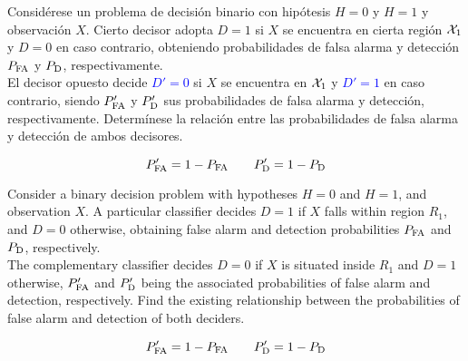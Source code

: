 \ifspanish

\question Considérese un problema de decisión binario con hipótesis $H=0$ y $H=1$ y observación $X$. Cierto decisor adopta $D=1$ si $X$ se encuentra en {cierta} región {${\cal X}_1$} y $D=0$ en caso contrario, obteniendo probabilidades de falsa alarma y detección $P_{\rm FA}$ y $P_{\rm D}$, respectivamente.\\
El decisor opuesto decide \textcolor{blue}{$D'=0$} si $X$ se encuentra en {${\cal X}_1$} y \textcolor{blue}{$D'=1$} en caso contrario, siendo $P_{\rm FA}'$ y $P_{\rm D}'$ sus probabilidades de falsa alarma y detección, respectivamente.  Determínese la relación entre las probabilidades de falsa alarma y detección de ambos decisores.\\
\begin{solution} 
$$P_{\rm FA}'=1-P_{\rm FA} \quad \quad P_{\rm D}'=1-P_{\rm D}$$
\end{solution}

\else

\question Consider a binary decision problem with hypotheses $H=0$ and $H=1$, and observation $X$.  A particular classifier decides $D=1$ if $X$ falls within region $R_1$, and $D=0$ otherwise, obtaining false alarm and detection probabilities $P_{\rm FA}$ and $P_{\rm D}$, respectively.\\
The complementary classifier decides $D=0$ if $X$ is situated inside $R_1$ and $D=1$ otherwise, $P_{\rm FA}'$ and $P_{\rm D}'$ being the associated probabilities of false alarm and detection, respectively.  Find the existing relationship between the probabilities of false alarm and detection of both deciders.\\

\begin{solution}
$$P_{\rm FA}'=1-P_{\rm FA} \quad \quad P_{\rm D}'=1-P_{\rm D}$$
\end{solution}

\fi